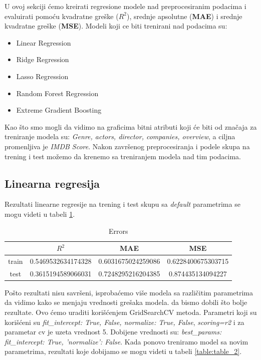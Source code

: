 \documentclass[a4paper]{article}
\begin{document}
U ovoj sekciji ćemo kreirati regresione modele nad preprocesiranim podacima i evaluirati pomoću kvadratne greške (\textbf{${R}^2$}), srednje apsolutne (\textbf{MAE}) i srednje kvadratne greške (\textbf{MSE}).
Modeli koji ce biti trenirani nad podacima su:
\begin{itemize}
	\item Linear Regression
	\item Ridge Regression
	\item Lasso Regression
	\item Random Forest Regression
	\item Extreme Gradient Boosting
\end{itemize}

Kao što smo mogli da vidimo na graficima bitni atributi koji će biti od značaja za treniranje modela su: \textit{Genre, actors, director, companies, overview}, a ciljna promenljiva je \textit{IMDB Score}. Nakon završenog preprocesiranja i podele skupa na trening i test možemo da krenemo sa treniranjem modela nad tim podacima.



\subsection{Linearna regresija}
\label{sec:linearna_1}

Rezultati linearne regresije na trening i test skupu sa \textit{default} parametrima se mogu videti u tabeli \ref{table:table_1}.

\begin{table}[h!]
\caption{Errors}
\centering %
\begin{tabular}{c c c c} %
\hline\hline %
 & ${R}^2$ & MAE & MSE \\ [0.2ex] %
\hline %
train & 0.5469532634174328 & 0.6031675024259086 & 0.6228400675303715 \\ %
test & 0.3615194589066031 & 0.7248295216204385 & 0.874435134094227 \\ [1ex] %
\end{tabular}
\label{table:table_1}
\end{table}

Pošto rezultati nisu savršeni, isprobaćemo više modela sa različitim parametrima da vidimo kako se menjaju vrednosti grešaka modela. da bismo dobili što bolje rezultate. Ovo ćemo uraditi korišćenjem GridSearchCV metoda\cite{gridSearchCV}. Parametri koji su korišćeni su \textit{fit\_intercept: True, False, normalize: True, False}, \textit{scoring=r2} i za parametar cv je uzeta vrednost 5. Dobijene vrednosti su: \textit{best\_params: {fit\_intercept: True, 'normalize': False}}. Kada ponovo treniramo model sa novim parametrima, rezultati koje dobijamo se mogu videti u tabeli \ref{table:table_2}.
\end{document}
